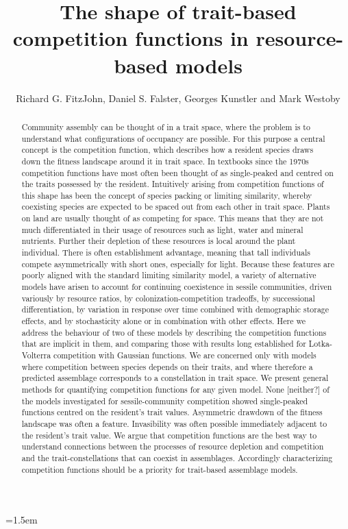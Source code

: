 \documentclass[a4paper,11pt]{article}
\title{The shape of trait-based competition functions in resource-based models}
\author{Richard G. FitzJohn, Daniel S. Falster, Georges Kunstler and Mark Westoby}
\date{}
\affiliation{Department of Biological Sciences, Macquarie University,
  Sydney, Australia}
\begin{document}

\mstitlepage
\parindent=1.5em
\addtolength{\parskip}{.3em}

\begin{abstract}
Community assembly can be thought of in a trait space, where the problem is to understand what configurations of occupancy are possible. For this purpose a central concept is the competition function, which describes how a resident species draws down the fitness landscape around it in trait space. In textbooks since the 1970s competition functions have most often been thought of as single-peaked and centred on the traits possessed by the resident. Intuitively arising from competition functions of this shape has been the concept of species packing or limiting similarity, whereby coexisting species are expected to be spaced out from each other in trait space.
Plants on land are usually thought of as competing for space. This means that they are not much differentiated in their usage of resources such as light, water and mineral nutrients. Further their depletion of these resources is local around the plant individual. There is often establishment advantage, meaning that tall individuals compete asymmetrically with short ones, especially for light. Because these features are poorly aligned with the standard limiting similarity model, a variety of alternative models have arisen to account for continuing coexistence in sessile communities, driven variously by resource ratios, by colonization-competition tradeoffs, by successional differentiation, by variation in response over time combined with demographic storage effects, and by stochasticity alone or in combination with other effects.
Here we address the behaviour of two of these models by describing the competition functions that are implicit in them, and comparing those with results long established for Lotka-Volterra competition with Gaussian functions. We are concerned only with models where competition between species depends on their traits, and where therefore a predicted assemblage corresponds to a constellation in trait space. We present general methods for quantifying competition functions for any given model.
None [neither?] of the models investigated for sessile-community competition showed single-peaked functions centred on the resident's trait values. Asymmetric drawdown of the fitness landscape was often a feature. Invasibility was often possible immediately adjacent to the resident's trait value. We argue that competition functions are the best way to understand connections between the processes of resource depletion and competition and the trait-constellations that can coexist in assemblages. Accordingly characterizing competition functions should be a priority for trait-based assemblage models.

\end{abstract}
\end{document}
